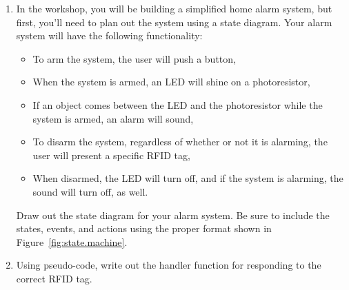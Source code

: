 \documentclass[11pt]{article} %
\begin{document}
\begin{enumerate}
\item In the workshop, you will be building a simplified home alarm system, but first, you’ll need to plan out the system using a state diagram. Your alarm system will have the following functionality:
\begin{itemize}
\item To arm the system, the user will push a button,
\item When the system is armed, an LED will shine on a photoresistor,
\item If an object comes between the LED and the photoresistor while the system is armed, an alarm will sound,
\item To disarm the system, regardless of whether or not it is alarming, the user will present a specific RFID tag,
\item When disarmed, the LED will turn off, and if the system is alarming, the sound will turn off, as well.
\end{itemize}

Draw out the state diagram for your alarm system. Be sure to include the states, events, and actions using the proper format shown in Figure~\ref{fig:state.machine}.
\vspace{2.5in}
\item Using pseudo-code, write out the handler function for responding to the correct RFID tag.

\end{enumerate}
\end{document}
